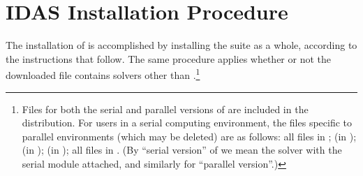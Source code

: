 \chapter{IDAS Installation Procedure}\label{c:install}

The installation of {\idas} is accomplished by installing the
{\sundials} suite as a whole, according to the instructions that
follow.   The same procedure applies whether or not the downloaded
file contains solvers other than {\idas}.\footnote{Files for both the
serial and parallel versions of {\idas} are included in the distribution.
For users in a serial computing environment, the files specific to parallel
environments (which may be deleted) are as follows:
all files in ;
 (in );
 (in );
 (in );
all files in .
(By ``serial version'' of {\idas} we mean the {\idas} solver with the
serial {\nvector} module attached, and similarly for ``parallel version''.)}


